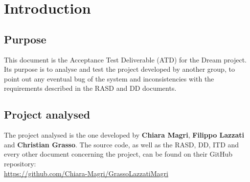 \section{Introduction}
\subsection{Purpose}
This document is the Acceptance Test Deliverable (ATD) for the Dream project. Its purpose is to analyse and test the project developed by another group, to point out any eventual bug of the system and inconsistencies with the requirements described in the RASD and DD documents.

\subsection{Project analysed}
The project analysed is the one developed by \textbf{Chiara Magri}, \textbf{Filippo Lazzati} and \textbf{Christian Grasso}.
The source code, as well as the RASD, DD, ITD and every other document concerning the project, can be found on their GitHub repository:\\
\href{https://github.com/Chiara-Magri/GrassoLazzatiMagri}{https://github.com/Chiara-Magri/GrassoLazzatiMagri}